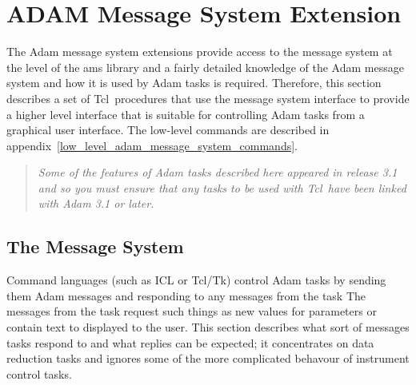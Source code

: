 \documentclass[twoside,11pt,nolof]{starlink}
\newenvironment{rquote}{\begin{quote}\raggedright}{\end{quote}}
\providecommand{\Tcl}{{\textsf{Tcl}}}
\providecommand{\TclTk}{{\textsf{Tcl/Tk}}}
\begin{document}
%
%


\section{\label{adam_message_system_extension}ADAM Message System Extension}

The Adam message system extensions provide access to the message system
at the level of the ams library and a fairly detailed knowledge
of the Adam message system and how it is used by Adam tasks is required.
Therefore, this section describes a set of \Tcl\ procedures that use the
message system interface to provide a higher level interface that is
suitable for controlling Adam tasks from a graphical user interface. The
low-level commands are described in
appendix~\ref{low_level_adam_message_system_commands}.

\begin{quote}
\emph{Some of the features of Adam tasks described here appeared in release
3.1 and so you must ensure that any tasks to be used with \Tcl\ have been
linked with Adam 3.1 or later.}
\end{quote}

\subsection{\label{message_system}The Message System}

Command languages (such as ICL or \TclTk ) control Adam tasks by
sending them Adam messages and responding to any messages from the task
The messages from the task request such things as new values for
parameters or contain text to displayed to the user.  This section
describes what sort of messages tasks respond to and what replies can
be expected; it concentrates on data reduction tasks and ignores some
of the more complicated behavour of instrument control tasks.
\end{document}
